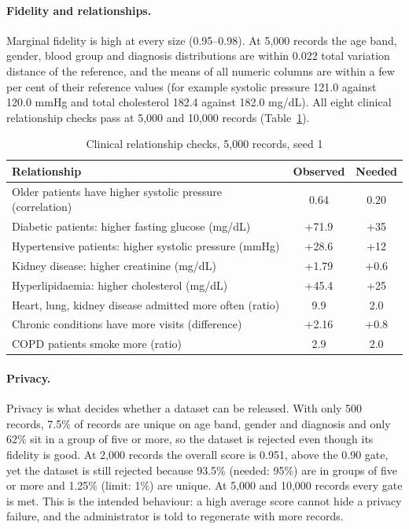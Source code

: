 \documentclass{tietreport}
\begin{document}
\paragraph{Fidelity and relationships.} Marginal fidelity is high at every
size (0.95--0.98). At 5,000 records the age band, gender, blood group and
diagnosis distributions are within 0.022 total variation distance of the
reference, and the means of all numeric columns are within a few per cent of
their reference values (for example systolic pressure 121.0 against 120.0
mmHg and total cholesterol 182.4 against 182.0 mg/dL). All eight clinical
relationship checks pass at 5,000 and 10,000 records (Table~\ref{tab:rel}).

\begin{table}[H]
\centering
\small
\begin{tabular}{p{8.2cm}cc}
\toprule
\textbf{Relationship} & \textbf{Observed} & \textbf{Needed} \\
\midrule
Older patients have higher systolic pressure (correlation) & 0.64 & 0.20 \\
Diabetic patients: higher fasting glucose (mg/dL) & +71.9 & +35 \\
Hypertensive patients: higher systolic pressure (mmHg) & +28.6 & +12 \\
Kidney disease: higher creatinine (mg/dL) & +1.79 & +0.6 \\
Hyperlipidaemia: higher cholesterol (mg/dL) & +45.4 & +25 \\
Heart, lung, kidney disease admitted more often (ratio) & 9.9 & 2.0 \\
Chronic conditions have more visits (difference) & +2.16 & +0.8 \\
COPD patients smoke more (ratio) & 2.9 & 2.0 \\
\bottomrule
\end{tabular}
\caption{Clinical relationship checks, 5,000 records, seed 1}
\label{tab:rel}
\end{table}

\paragraph{Privacy.} Privacy is what decides whether a dataset can be
released. With only 500 records, 7.5\% of records are unique on age band,
gender and diagnosis and only 62\% sit in a group of five or more, so the
dataset is rejected even though its fidelity is good. At 2,000 records the
overall score is 0.951, above the 0.90 gate, yet the dataset is still
rejected because 93.5\% (needed: 95\%) are in groups of five or more and
1.25\% (limit: 1\%) are unique. At 5,000 and 10,000 records every gate is met.
This is the intended behaviour: a high average score cannot hide a privacy
failure, and the administrator is told to regenerate with more records.
\end{document}

